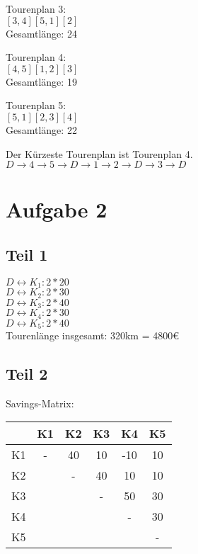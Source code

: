 \documentclass[a4paper,11pt]{article}
\begin{document}
Tourenplan 3: \\
$[3,4][5,1][2]$ \\
Gesamtlänge: 24 \newline

Tourenplan 4: \\
$[4,5][1,2][3]$ \\
Gesamtlänge: 19 \newline

Tourenplan 5: \\
$[5,1][2,3][4]$ \\
Gesamtlänge: 22 \newline

Der Kürzeste Tourenplan ist Tourenplan 4. \\
$D \to 4 \to 5 \to D \to 1 \to 2 \to D \to 3 \to D$

\section*{Aufgabe 2}

\subsection*{Teil 1}

$D \leftrightarrow K_1: 2 * 20$ \\
$D \leftrightarrow K_2: 2 * 30$ \\
$D \leftrightarrow K_3: 2 * 40$ \\
$D \leftrightarrow K_4: 2 * 30$ \\
$D \leftrightarrow K_5: 2 * 40$ \\
Tourenlänge insgesamt: 320km = 4800€

\subsection*{Teil 2}

Savings-Matrix: \newline

\begin{tabular}{c|c|c|c|c|c}
   &  K1  &  K2  &  K3  &  K4  &  K5  \\ \hline
K1 &  -   &  40  &  10  & -10  &  10  \\ \hline
K2 &      &  -   &  40  &  10  &  10  \\ \hline
K3 &      &      &  -   &  50  &  30  \\ \hline
K4 &      &      &      &  -   &  30  \\ \hline
K5 &      &      &      &      &  - 
\end{tabular}
\end{document}
